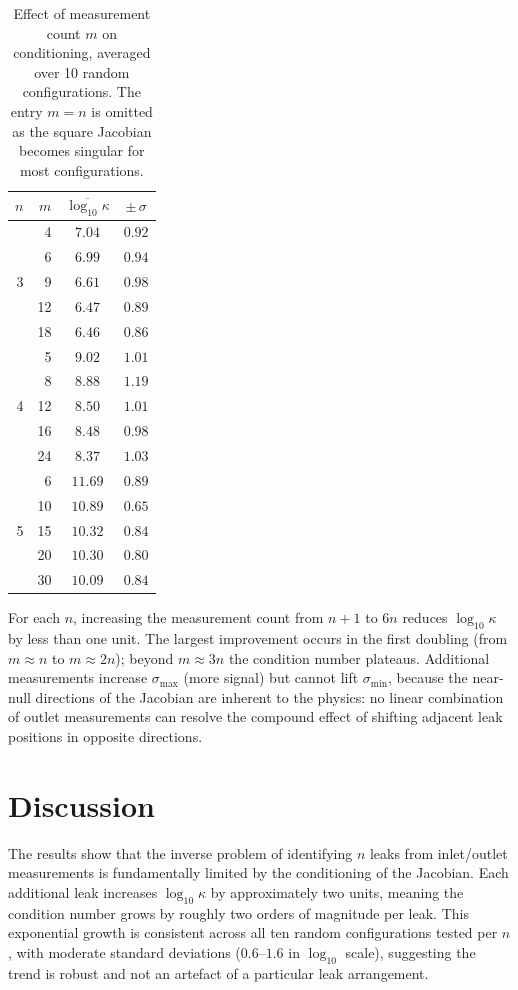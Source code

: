\begin{table}[htbp]
\centering
\caption{Effect of measurement count $m$ on conditioning, averaged over 10 random configurations. The entry $m = n$ is omitted as the square Jacobian becomes singular for most configurations.}
\label{tab:more-meas}
\begin{tabular}{r r c c}
\toprule
$n$ & $m$ & $\overline{\log_{10} \kappa}$ & $\pm\, \sigma$ \\
\midrule
\multirow{5}{*}{3}
 &  4 & $7.04$ & $0.92$ \\
 &  6 & $6.99$ & $0.94$ \\
 &  9 & $6.61$ & $0.98$ \\
 & 12 & $6.47$ & $0.89$ \\
 & 18 & $6.46$ & $0.86$ \\
\midrule
\multirow{5}{*}{4}
 &  5 & $9.02$ & $1.01$ \\
 &  8 & $8.88$ & $1.19$ \\
 & 12 & $8.50$ & $1.01$ \\
 & 16 & $8.48$ & $0.98$ \\
 & 24 & $8.37$ & $1.03$ \\
\midrule
\multirow{5}{*}{5}
 &  6 & $11.69$ & $0.89$ \\
 & 10 & $10.89$ & $0.65$ \\
 & 15 & $10.32$ & $0.84$ \\
 & 20 & $10.30$ & $0.80$ \\
 & 30 & $10.09$ & $0.84$ \\
\bottomrule
\end{tabular}
\end{table}

For each $n$, increasing the measurement count from $n{+}1$ to $6n$ reduces $\log_{10} \kappa$ by less than one unit.
The largest improvement occurs in the first doubling (from $m \approx n$ to $m \approx 2n$); beyond $m \approx 3n$ the condition number plateaus.
Additional measurements increase $\sigma_{\max}$ (more signal) but cannot lift $\sigma_{\min}$, because the near-null directions of the Jacobian are inherent to the physics: no linear combination of outlet measurements can resolve the compound effect of shifting adjacent leak positions in opposite directions.


\section{Discussion}\label{sec:cond-discussion}

The results show that the inverse problem of identifying $n$ leaks from inlet/outlet measurements is fundamentally limited by the conditioning of the Jacobian.
Each additional leak increases $\log_{10} \kappa$ by approximately two units, meaning the condition number grows by roughly two orders of magnitude per leak.
This exponential growth is consistent across all ten random configurations tested per $n$, with moderate standard deviations ($0.6$--$1.6$ in $\log_{10}$ scale), suggesting the trend is robust and not an artefact of a particular leak arrangement.

